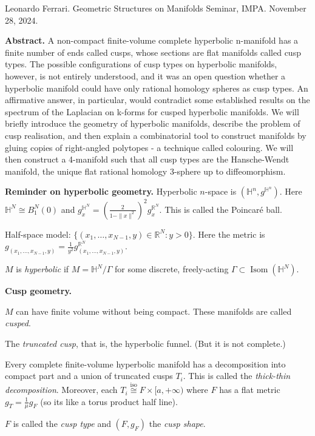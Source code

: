 \noindent
Leonardo Ferrari. Geometric Structures on
Manifolds Seminar, IMPA. November 28, 2024.

\medskip\noindent
{\bf Abstract.}
A non-compact finite-volume complete
hyperbolic n-manifold has a finite number of
ends called cusps, whose sections are flat
manifolds called cusp types. The possible
configurations of cusp types on hyperbolic
manifolds, however, is not entirely
understood, and it was an open question
whether a hyperbolic manifold could have only
rational homology spheres as cusp types. An
affirmative answer, in particular, would
contradict some established results on the
spectrum of the Laplacian on k-forms for
cusped hyperbolic manifolds. We will briefly
introduce the geometry of hyperbolic
manifolds, describe the problem of cusp
realisation, and then explain a combinatorial
tool to construct manifolds by gluing copies
of right-angled polytopes - a technique
called colouring. We will then construct a
4-manifold such that all cusp types are the
Hansche-Wendt manifold, the unique flat
rational homology 3-sphere up to
diffeomorphism.

\medskip\noindent
{\bf Reminder on hyperbolic geometry.}
Hyperbolic $n$-space is
$(\mathbb{H}^n,g^{\mathbb{H}^n})$. Here
$\mathbb{H}^N\cong B_1^N(0)$ and
$g^{\mathbb{H}^N}_x=\left(
\frac{2}{1-\|x\|^2} \right)^2
g^{\mathbb{R}^N}_x$. This is called the
Poincaré ball.

Half-space model: $\{(x_1,\ldots,x_{N-1},y)
\in \mathbb{R}^N:y>0\}$. Here the metric is
$g_{(x_1,\ldots,x_{N-1},y)}=
\frac{1}{y^2}g^{\mathbb{R}^N}_
{(x_1,\ldots,x_{N-1},y)}$.

$M$ is \textit{hyperbolic} if
$M=\mathbb{H}^N/\Gamma$ for some discrete,
freely-acting $\Gamma \subset
\operatorname{Isom}(\mathbb{H}^N)$.

\medskip\noindent
{\bf Cusp geometry.}

\begin{remark}
\label{remark-ferrari-cusped}
$M$ can have finite volume without being
compact. These manifolds are called
\textit{cusped}.
\end{remark}

\begin{example}
\label{example-ferrari-truncated-cusp}
The \textit{truncated cusp}, that is, the
hyperbolic funnel. (But it is not complete.)
\end{example}

\begin{proposition}
\label{proposition-ferrari-thick-thin}
Every complete finite-volume hyperbolic
manifold has a decomposition into compact
part and a union of truncated cusps $T_i$.
This is called the \textit{thick-thin
decomposition}. Moreover, each
$T_i\overset{\operatorname{iso}}{\cong}F
\times [a, +\infty)$ where $F$ has a flat
metric $g_T=\frac{1}{\mu}g_F$ (so its like a
torus product half line).

$F$ is called the \textit{cusp type} and
$(F,g_F)$ the \textit{cusp shape}.
\end{proposition}

